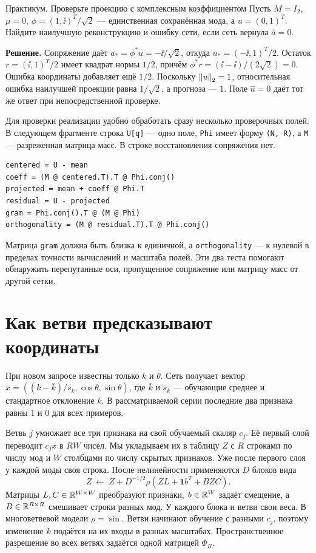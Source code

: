 \begin{worked}{Практикум. Проверьте проекцию с комплексным коэффициентом}
Пусть $M=I_2$, $\mu=0$, $\phi=(1,\ii)^T/\sqrt{2}$ --- единственная
сохранённая мода, а $u=(0,1)^T$. Найдите наилучшую реконструкцию и
ошибку сети, если сеть вернула $\widehat a=0$.

\textbf{Решение.} Сопряжение даёт $a_*=\phi^*u=-\ii/\sqrt{2}$, откуда
$u_*=(-\ii,1)^T/2$. Остаток $r=(\ii,1)^T/2$ имеет квадрат нормы $1/2$,
причём $\phi^*r=(\ii-\ii)/(2\sqrt{2})=0$. Ошибка координаты добавляет ещё $1/2$.
Поскольку $\left\lVert u\right\rVert_2=1$, относительная ошибка наилучшей проекции равна
$1/\sqrt2$, а прогноза --- $1$. Поле $\widehat u=0$ даёт тот же ответ
при непосредственной проверке.
\end{worked}

Для проверки реализации удобно обработать сразу несколько проверочных
полей. В следующем фрагменте строка \texttt{U[q]} --- одно поле,
\texttt{Phi} имеет форму \texttt{(N, R)}, а \texttt{M} --- разреженная
матрица масс. В строке восстановления сопряжения нет.
\begin{lstlisting}
centered = U - mean
coeff = (M @ centered.T).T @ Phi.conj()
projected = mean + coeff @ Phi.T
residual = U - projected
gram = Phi.conj().T @ (M @ Phi)
orthogonality = (M @ residual.T).T @ Phi.conj()
\end{lstlisting}
Матрица \texttt{gram} должна быть близка к единичной, а
\texttt{orthogonality} --- к нулевой в пределах точности вычислений
и масштаба полей. Эти два теста помогают обнаружить перепутанные оси,
пропущенное сопряжение или матрицу масс от другой сетки.

\section{Как ветви предсказывают координаты}
\label{adv:architecture}

При новом запросе известны только $k$ и $\theta$. Сеть получает вектор
$x=((k-\bar k)/s_k,\cos\theta,\sin\theta)$, где $\bar k$ и $s_k$ ---
обучающие среднее и стандартное отклонение $k$. В рассматриваемой серии
последние два признака равны 1 и 0 для всех примеров.

Ветвь $j$ умножает все три признака на свой обучаемый скаляр $c_j$.
Её первый слой переводит $c_j x$ в $R W$ чисел. Мы укладываем их в
таблицу $Z$ с $R$ строками по числу мод и $W$ столбцами по числу скрытых
признаков. Уже после первого слоя у каждой моды своя строка. После
нелинейности применяются $D$ блоков вида
\[
 Z\ \longleftarrow\ Z+D^{-1/2}
 \rho\!\left(ZL+\mathbf1 b^T + BZC\right).
\]
Матрицы $L,C\in\mathbb{R}^{W\times W}$ преобразуют признаки, $b\in\mathbb{R}^W$ задаёт
смещение, а $B\in\mathbb{R}^{R\times R}$ смешивает строки разных мод. У каждого
блока и ветви свои веса. В многоветвевой модели $\rho=\sin$.
Ветви начинают обучение с разными $c_j$, поэтому изменение $k$ подаётся
на их входы в разных масштабах.
Пространственное разрешение во всех ветвях задаётся одной матрицей $\Phi_R$.


